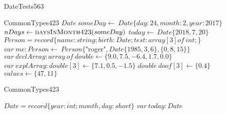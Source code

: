 \documentclass[a4paper,10pt]{article}
\begin{document}
\begin{algorithm}
\caption{DateTests563}
\begin{algorithmic}[5]
    \State CommonTypes423
  \EndDecl
  \State \(Date\ someDay\gets\ Date\{day:24,month:2,year:2017\}\)
  \State \(nDays\gets\Call{daysInMonth423}{someDay}\)
  \State \(today\gets\ Date\{2018,7,20\}\)
    \State \(Person = record\{name:string;birth:Date;test:array[3]of\ int;\}\)
  \EndDecl
  \State \(var\ me:Person\gets\ Person\{\)"{}roger"{}\(,Date\{1985,3,6\},\{0,8,15\}\}\)
  \State \(var\ declArray:array\ of\ double\gets\{9.0,7.5,-6.4,1.7,0.0\}\)
  \State \(var\ explArray:double[3]\gets\{7.1,0.5,-1.5\}\)
  \State \(double\ doof[3]\gets\{0.4\}\)
  \State \(values\gets\{47,11\}\)
\EndProcedure
\end{algorithmic}
\end{algorithm}


\begin{algorithm}
\caption{CommonTypes423}
\begin{algorithmic}[5]
\State {}
    \State \(Date = record\{year:int;month,day:short\}\)
  \EndDecl
  \State \(var\ today:Date\)
\EndProcedure
\end{algorithmic}
\end{algorithm}
\end{document}
